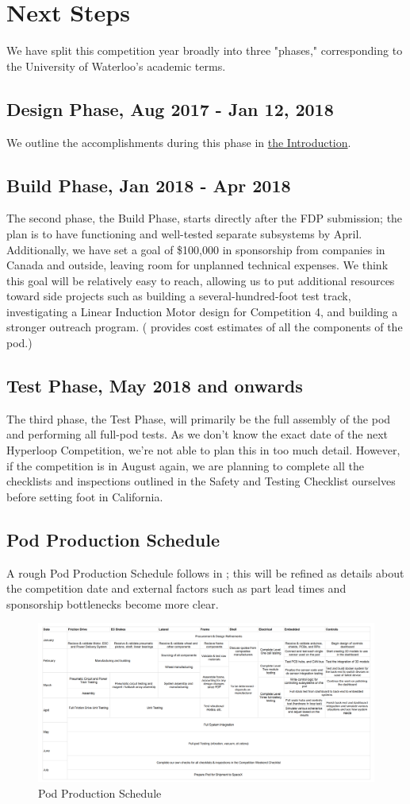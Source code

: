 \documentclass[main.tex]{subfiles}
\begin{document}
    \chapter{Next Steps}
    \label{ch:next-steps}
    We have split this competition year broadly into three "phases," corresponding to the University of Waterloo's academic terms.
    
    \section{Design Phase, Aug 2017 - Jan 12, 2018}
    We outline the accomplishments during this phase in \hyperref[ch:intro]{the Introduction}.
    
    \section{Build Phase, Jan 2018 - Apr 2018}
    The second phase, the Build Phase, starts directly after the FDP submission; the plan is to have functioning and well-tested separate subsystems by April. Additionally, we have set a goal of \$100,000 in sponsorship from companies in Canada and outside, leaving room for unplanned technical expenses. We think this goal will be relatively easy to reach, allowing us to put additional resources toward side projects such as building a several-hundred-foot test track, investigating a Linear Induction Motor design for Competition 4, and building a stronger outreach program. ( provides cost estimates of all the components of the pod.)
    
	\section{Test Phase, May 2018 and onwards}
    The third phase, the Test Phase, will primarily be the full assembly of the pod and performing all full-pod tests. As we don't know the exact date of the next Hyperloop Competition, we're not able to plan this in too much detail. However, if the competition is in August again, we are planning to complete all the checklists and inspections outlined in the Safety and Testing Checklist ourselves before setting foot in California.
    
    \section{Pod Production Schedule}
      A rough Pod Production Schedule follows in ; this will be refined as details about the competition date and external factors such as part lead times and sponsorship bottlenecks become more clear.
    
    \begin{figure}
        \centering
        \includegraphics[width=\textwidth]{images/productionsched.png}
        \caption{Pod Production Schedule}
        \label{fig:pps}
    \end{figure}
\end{document}
